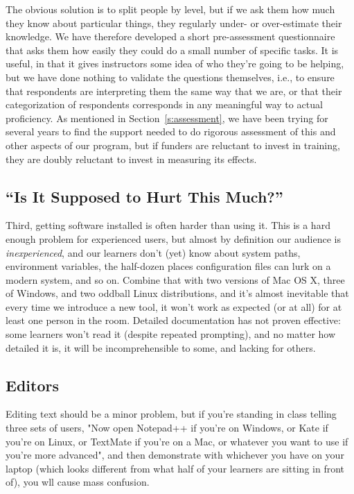 \documentclass[10pt,a4paper,twocolumn]{article}
\begin{document}
The obvious solution is to split people by level, but if we ask them
how much they know about particular things, they regularly under- or
over-estimate their knowledge.  We have therefore developed a short
pre-assessment questionnaire that asks them how easily they could do a
small number of specific tasks.  It is useful, in that it gives
instructors some idea of who they're going to be helping, but we have
done nothing to validate the questions themselves, i.e., to ensure
that respondents are interpreting them the same way that we are, or
that their categorization of respondents corresponds in any meaningful
way to actual proficiency.  As mentioned in Section~\ref{s:assessment},
we have been trying for several years to find the support needed to do
rigorous assessment of this and other aspects of our program, but if
funders are reluctant to invest in training, they are doubly reluctant
to invest in measuring its effects.

\subsection{``Is It Supposed to Hurt This Much?''}\label{s:installation}

Third, getting software installed is often harder than using it. This
is a hard enough problem for experienced users, but almost by
definition our audience is \emph{inexperienced}, and our learners
don't (yet) know about system paths, environment variables, the
half-dozen places configuration files can lurk on a modern system, and
so on. Combine that with two versions of Mac OS X, three of Windows,
and two oddball Linux distributions, and it's almost inevitable that
every time we introduce a new tool, it won't work as expected (or at
all) for at least one person in the room. Detailed documentation has
not proven effective: some learners won't read it (despite repeated
prompting), and no matter how detailed it is, it will be
incomprehensible to some, and lacking for others.

\subsection{Editors}\label{s:editors}

Editing text should be a minor problem, but if you're standing in
class telling three sets of users, "Now open Notepad++ if you're on
Windows, or Kate if you're on Linux, or TextMate if you're on a Mac,
or whatever you want to use if you're more advanced", and then
demonstrate with whichever you have on your laptop (which looks
different from what half of your learners are sitting in front of),
you wll cause mass confusion.
\end{document}
